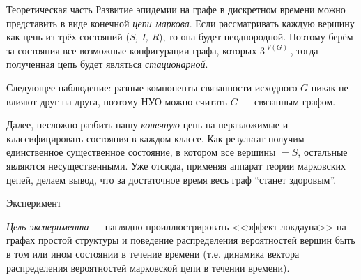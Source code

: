 	\begin{frame}{Теоретическая часть}
		\setlength{\parskip}{0.1cm}
		Развитие эпидемии на графе в дискретном времени можно представить в виде конечной \textit{цепи маркова}. Если рассматривать каждую вершину как цепь из трёх состояний (\textit{S, I, R}), то она будет неоднородной. Поэтому берём за состояния все возможные конфигурации графа, которых $3^{\lvert V(G) \rvert}$, тогда полученная цепь будет являться \textit{стационарной}.
		
		\pause
		
		Следующее наблюдение: разные компоненты связанности исходного $G$ никак не влияют друг на друга, поэтому НУО можно считать $G$ --- связанным графом.
		
		\pause
		
		Далее, несложно разбить нашу \textit{конечную} цепь на неразложимые и классифицировать состояния в каждом классе. Как результат получим единственное существенное состояние, в котором все вершины $= \mathit{S}$, остальные являются несущественными. Уже отсюда, применяя аппарат теории марковских цепей, делаем вывод, что за достаточное время весь граф ``станет здоровым''.
		
	\end{frame}

	\begin{frame}{Эксперимент}
		
		\textit{Цель эксперимента} --- наглядно проиллюстрировать <<эффект локдауна>> на графах простой структуры и поведение распределения вероятностей вершин быть в том или ином состоянии в течение времени (т.е. динамика вектора распределения вероятностей марковской цепи в течении времени).
		
	\end{frame}


